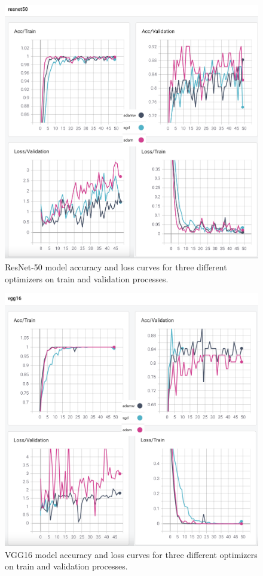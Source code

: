 \begin{figure}[!h]
    \centering
    \includegraphics[width=\linewidth]{fig/resnet50.png}
    \vspace{2mm}
    \caption{ResNet-50 model accuracy and loss curves for three different optimizers on train and validation processes.}
    \label{fig:resnet50_plots}
\end{figure}

\begin{figure}[!h]
    \centering
    \includegraphics[width=\linewidth]{fig/vgg16.png}
    \vspace{2mm}
    \caption{VGG16 model accuracy and loss curves for three different optimizers on train and validation processes.}
    \label{fig:vgg16_plots}
\end{figure}

